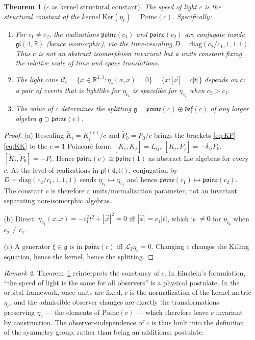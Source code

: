 \documentclass[12pt]{article}
\theoremstyle{plain}
\newtheorem{theorem}{Theorem}[section]
\theoremstyle{definition}
\theoremstyle{remark}
\newtheorem{remark}[theorem]{Remark}
\newcommand{\R}{\mathbb{R}}
\newcommand{\Poinc}{\mathrm{Poinc}}
\newcommand{\Ker}{\mathrm{Ker}}
\begin{document}
\begin{theorem}[$c$ as kernel structural constant]\label{thm:c-structural}
The speed of light $c$ is the structural constant of the kernel $\Ker(\eta_c) = \Poinc(c)$. Specifically:
\begin{enumerate}[label=\textup{(\alph*)}]
    \item For $c_1 \neq c_2$, the realizations $\mathfrak{poinc}(c_1)$ and $\mathfrak{poinc}(c_2)$ are conjugate inside $\mathfrak{gl}(4,\R)$ (hence isomorphic), via the time-rescaling $D = \mathrm{diag}(c_2/c_1,1,1,1)$. Thus $c$ is \emph{not} an abstract isomorphism invariant but a units constant fixing the relative scale of time and space translations.
    \item The light cone $\mathcal{C}_c = \{x \in \R^{1,3} : \eta_c(x,x) = 0\} = \{x : |\vec{x}| = c|t|\}$ depends on $c$: a pair of events that is lightlike for $\eta_{c_1}$ is spacelike for $\eta_{c_2}$ when $c_2 > c_1$.
    \item The value of $c$ determines the splitting $\mathfrak{g} = \mathfrak{poinc}(c) \oplus \mathfrak{def}(c)$ of any larger algebra $\mathfrak{g} \supset \mathfrak{poinc}(c)$.
\end{enumerate}
\end{theorem}

\begin{proof}
(a) Rescaling $\tilde K_i = K_i^{(c)}/c$ and $\tilde P_0 = P_0/c$ brings the brackets \eqref{eq:KP}--\eqref{eq:KK} to the $c=1$ Poincar\'e form: $[\tilde K_i, \tilde K_j] = L_{ij}$, $[\tilde K_i, P_j] = -\delta_{ij}\tilde P_0$, $[\tilde K_i, \tilde P_0] = -P_i$. Hence $\mathfrak{poinc}(c) \cong \mathfrak{poinc}(1)$ as abstract Lie algebras for every $c$. At the level of realizations in $\mathfrak{gl}(4,\R)$, conjugation by $D = \mathrm{diag}(c_2/c_1, 1,1,1)$ sends $\eta_{c_1} \mapsto \eta_{c_2}$ and hence $\mathfrak{poinc}(c_1) \mapsto \mathfrak{poinc}(c_2)$. The constant $c$ is therefore a units/normalization parameter, not an invariant separating non-isomorphic algebras.

(b) Direct: $\eta_{c_1}(x,x) = -c_1^2 t^2 + |\vec{x}|^2 = 0$ iff $|\vec{x}| = c_1|t|$, which is $\neq 0$ for $\eta_{c_2}$ when $c_2 \neq c_1$.

(c) A generator $\xi \in \mathfrak{g}$ is in $\mathfrak{poinc}(c)$ iff $\mathcal{L}_\xi\eta_c = 0$. Changing $c$ changes the Killing equation, hence the kernel, hence the splitting.
\end{proof}

\begin{remark}\label{rmk:c-not-postulate}
Theorem~\ref{thm:c-structural} reinterprets the constancy of $c$. In Einstein's formulation, ``the speed of light is the same for all observers'' is a physical postulate. In the orbital framework, once units are fixed, $c$ is the normalization of the kernel metric $\eta_c$, and the admissible observer changes are exactly the transformations preserving $\eta_c$ --- the elements of $\Poinc(c)$ --- which therefore leave $c$ invariant by construction. The observer-independence of $c$ is thus built into the definition of the symmetry group, rather than being an additional postulate.
\end{remark}
\end{document}
